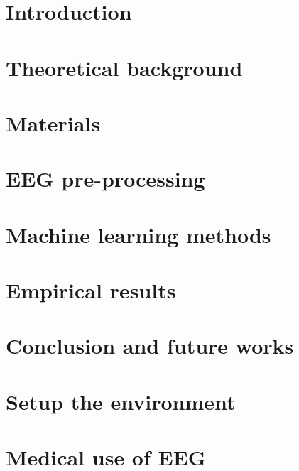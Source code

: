 \documentclass[12pt]{report}
\begin{document}
\chapter{Introduction}


\chapter{Theoretical background}


\chapter{Materials}

 
\chapter{EEG pre-processing}


\chapter{Machine learning methods}


\chapter{Empirical results}


\chapter{Conclusion and future works}


\appendix
\chapter{Setup the environment}


\chapter{Medical use of EEG~\cite{Medical}}




\end{document}
